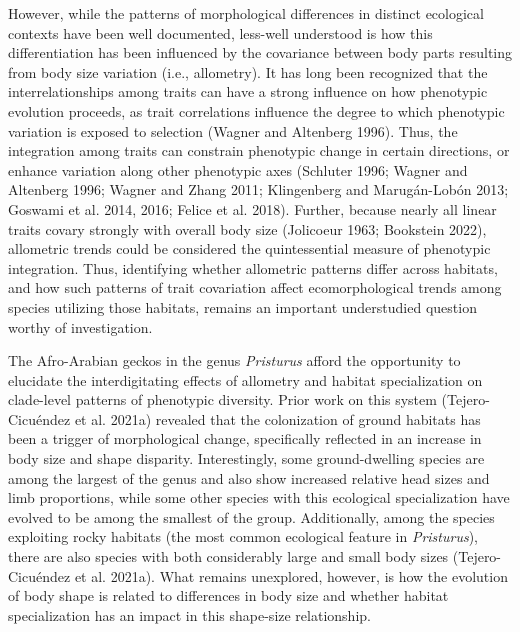\documentclass[
  11pt,
]{article}
\begin{document}
However, while the patterns of morphological differences in distinct
ecological contexts have been well documented, less-well understood is
how this differentiation has been influenced by the covariance between
body parts resulting from body size variation (i.e., allometry). It has
long been recognized that the interrelationships among traits can have a
strong influence on how phenotypic evolution proceeds, as trait
correlations influence the degree to which phenotypic variation is
exposed to selection (Wagner and Altenberg 1996). Thus, the integration
among traits can constrain phenotypic change in certain directions, or
enhance variation along other phenotypic axes (Schluter 1996; Wagner and
Altenberg 1996; Wagner and Zhang 2011; Klingenberg and Marugán-Lobón
2013; Goswami et al. 2014, 2016; Felice et al. 2018). Further, because
nearly all linear traits covary strongly with overall body size
(Jolicoeur 1963; Bookstein 2022), allometric trends could be considered
the quintessential measure of phenotypic integration. Thus, identifying
whether allometric patterns differ across habitats, and how such
patterns of trait covariation affect ecomorphological trends among
species utilizing those habitats, remains an important understudied
question worthy of investigation. \hfill\break

The Afro-Arabian geckos in the genus \emph{Pristurus} afford the
opportunity to elucidate the interdigitating effects of allometry and
habitat specialization on clade-level patterns of phenotypic diversity.
Prior work on this system (Tejero-Cicuéndez et al. 2021a) revealed that
the colonization of ground habitats has been a trigger of morphological
change, specifically reflected in an increase in body size and shape
disparity. Interestingly, some ground-dwelling species are among the
largest of the genus and also show increased relative head sizes and
limb proportions, while some other species with this ecological
specialization have evolved to be among the smallest of the group.
Additionally, among the species exploiting rocky habitats (the most
common ecological feature in \emph{Pristurus}), there are also species
with both considerably large and small body sizes (Tejero-Cicuéndez et
al. 2021a). What remains unexplored, however, is how the evolution of
body shape is related to differences in body size and whether habitat
specialization has an impact in this shape-size relationship.
\hfill\break
\end{document}
